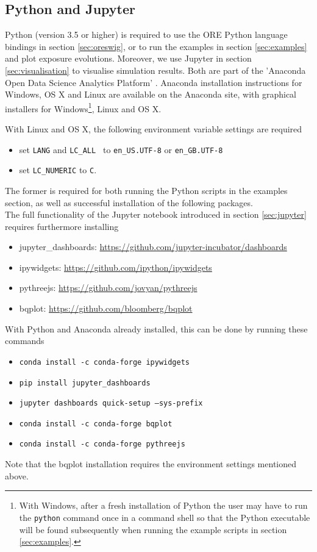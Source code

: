 \documentclass[12pt, a4paper]{article}
\begin{document}
{\subsection{Python and Jupyter}\label{sec:python}

Python (version 3.5 or higher) is required to use the ORE Python language bindings in section \ref{sec:oreswig}, 
or to run the examples in section \ref{sec:examples} and plot exposure
evolutions. Moreover, we use Jupyter \cite{jupyter} in section \ref{sec:visualisation} to visualise simulation
results. Both are part of the 'Anaconda Open Data Science Analytics Platform' \cite{Anaconda}. Anaconda installation
instructions for Windows, OS X and Linux are available on the Anaconda site, with graphical installers for
Windows\footnote{With Windows, after a fresh installation of Python the user may have to run the {\tt python} command
  once in a command shell so that the Python executable will be found subsequently when running the example scripts in
  section \ref{sec:examples}.}, Linux and OS X.

With Linux and OS X, the following environment variable settings are required
\begin{itemize}
\item set {\tt LANG} and {\tt LC\_ALL } to {\tt en\_US.UTF-8} or {\tt en\_GB.UTF-8}
\item set {\tt LC\_NUMERIC} to {\tt C}. 
\end{itemize}
The former is required for both running the Python scripts in the examples section, as well as successful installation
of the following packages. \\

The full functionality of the Jupyter notebook introduced in section \ref{sec:jupyter} requires furthermore installing
\begin{itemize}
\item jupyter\_dashboards: \url{https://github.com/jupyter-incubator/dashboards}
\item ipywidgets: \url{https://github.com/ipython/ipywidgets}
\item pythreejs: \url{https://github.com/jovyan/pythreejs}
\item bqplot: \url{https://github.com/bloomberg/bqplot}
\end{itemize}
With Python and Anaconda already installed, this can be done by running these commands
\begin{itemize}
\item {\tt conda install -c conda-forge ipywidgets}
\item {\tt pip install jupyter\_dashboards}
\item {\tt jupyter dashboards quick-setup --sys-prefix}
\item {\tt conda install -c conda-forge bqplot}
\item {\tt conda install -c conda-forge pythreejs}
\end{itemize}
Note that the bqplot installation requires the environment settings mentioned above.

}
\end{document}
